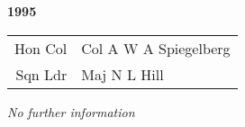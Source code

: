 \begin{center}
  \Huge
  \textbf{1995}
\end{center}

\begin{center}
  \small
  \begin{tabular}{rl}
    Hon Col & Col A W A Spiegelberg \\
    Sqn Ldr & Maj N L Hill \\
  \end{tabular}
\end{center}

\begin{center}
  \textit{No further information}
\end{center}

\vspace{50mm}

\pagebreak
